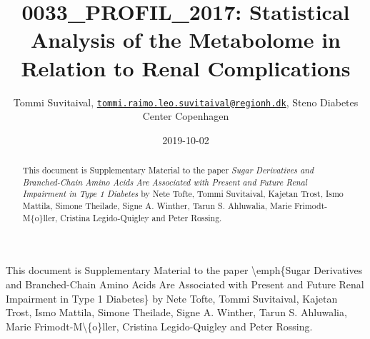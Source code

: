 \documentclass[]{article}
\title{0033\_PROFIL\_2017: Statistical Analysis of the Metabolome in Relation
to Renal Complications}
\author{Tommi Suvitaival,
\href{mailto:tommi.raimo.leo.suvitaival@regionh.dk}{\nolinkurl{tommi.raimo.leo.suvitaival@regionh.dk}},
Steno Diabetes Center Copenhagen}
\date{2019-10-02}
\begin{document}
\maketitle
\begin{abstract}
This document is Supplementary Material to the paper
\emph{Sugar Derivatives and Branched-Chain Amino Acids Are Associated with Present and Future Renal Impairment in Type 1 Diabetes}
by Nete Tofte, Tommi Suvitaival, Kajetan Trost, Ismo Mattila, Simone
Theilade, Signe A. Winther, Tarun S. Ahluwalia, Marie
Frimodt-M\{o\}ller, Cristina Legido-Quigley and Peter Rossing.
\end{abstract}

{
\setcounter{tocdepth}{6}
\tableofcontents
}
\newpage

This document is Supplementary Material to the paper
\textbackslash{}emph\{Sugar Derivatives and Branched-Chain Amino Acids
Are Associated with Present and Future Renal Impairment in Type 1
Diabetes\} by Nete Tofte, Tommi Suvitaival, Kajetan Trost, Ismo Mattila,
Simone Theilade, Signe A. Winther, Tarun S. Ahluwalia, Marie
Frimodt-M\textbackslash{}\{o\}ller, Cristina Legido-Quigley and Peter
Rossing.

\newpage
\end{document}
